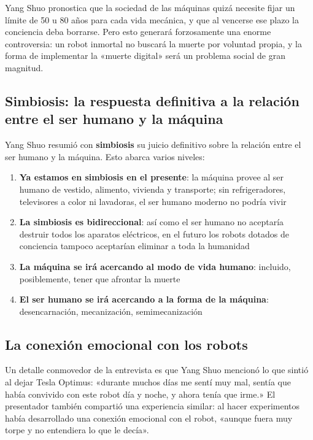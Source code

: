 \documentclass[a4paper]{article}
\begin{document}
Yang Shuo pronostica que la sociedad de las máquinas quizá necesite fijar un límite de 50 u 80 años para cada vida mecánica, y que al vencerse ese plazo la conciencia deba borrarse. Pero esto generará forzosamente una enorme controversia: un robot inmortal no buscará la muerte por voluntad propia, y la forma de implementar la «muerte digital» será un problema social de gran magnitud.

\subsection{Simbiosis: la respuesta definitiva a la relación entre el ser humano y la máquina}

Yang Shuo resumió con \textbf{simbiosis} su juicio definitivo sobre la relación entre el ser humano y la máquina. Esto abarca varios niveles:

\begin{enumerate}
    \item \textbf{Ya estamos en simbiosis en el presente}: la máquina provee al ser humano de vestido, alimento, vivienda y transporte; sin refrigeradores, televisores a color ni lavadoras, el ser humano moderno no podría vivir
    \item \textbf{La simbiosis es bidireccional}: así como el ser humano no aceptaría destruir todos los aparatos eléctricos, en el futuro los robots dotados de conciencia tampoco aceptarían eliminar a toda la humanidad
    \item \textbf{La máquina se irá acercando al modo de vida humano}: incluido, posiblemente, tener que afrontar la muerte
    \item \textbf{El ser humano se irá acercando a la forma de la máquina}: desencarnación, mecanización, semimecanización
\end{enumerate}

\subsection{La conexión emocional con los robots}

Un detalle conmovedor de la entrevista es que Yang Shuo mencionó lo que sintió al dejar Tesla Optimus: «durante muchos días me sentí muy mal, sentía que había convivido con este robot día y noche, y ahora tenía que irme.» El presentador también compartió una experiencia similar: al hacer experimentos había desarrollado una conexión emocional con el robot, «aunque fuera muy torpe y no entendiera lo que le decía».
\end{document}
